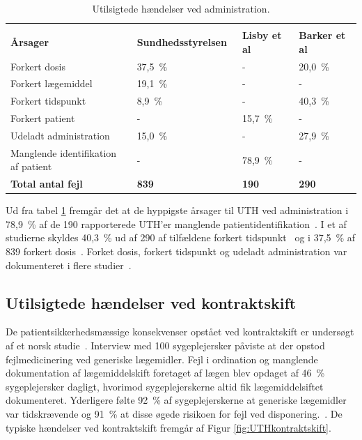 \vspace{2mm}
\begin{longtable}{p{5cm}|p{4.2cm}|p{2cm}|p{2cm}}
	\caption{Utilsigtede hændelser ved administration.}
	\vspace{2mm}
	\label{table:UTHAdministration} \\
\cellcolor[HTML]{C0C0C0} {\textbf{Årsager}} & 
{\cellcolor[HTML]{C0C0C0}\textbf{Sundhedsstyrelsen~\citep{Sundhedsstyrelsen2005}}} &
{\cellcolor[HTML]{C0C0C0}\textbf{Lisby et al~\citep{Lisby2005}}} &
{\cellcolor[HTML]{C0C0C0}\textbf{Barker et al~\citep{Barker2002}}} \\ \hline
Forkert dosis & 37,5~\% & - & 20,0~\% \\ \hline
Forkert lægemiddel & 19,1~\% & - & - \\ \hline
Forkert tidspunkt & 8,9~\% & - & 40,3~\% \\ \hline
Forkert patient & - & 15,7~\% &  - \\ \hline
Udeladt administration & 15,0~\% & - & 27,9~\% \\ \hline
Manglende identifikation af patient & - & 78,9~\% & - \\ \hline
\cellcolor[HTML]{C0C0C0} {\textbf{Total antal fejl}} & 
{\cellcolor[HTML]{C0C0C0}\textbf{839}} &
{\cellcolor[HTML]{C0C0C0}\textbf{190}} &
{\cellcolor[HTML]{C0C0C0}\textbf{290}}
\end{longtable}
\vspace{0.25cm}

Ud fra tabel \ref{table:UTHAdministration} fremgår det at de hyppigste årsager til UTH ved administration i 78,9~\% af de 190 rapporterede UTH'er manglende patientidentifikation~\citep{Lisby2005}. I et af studierne skyldes 40,3~\% ud af 290 af tilfældene forkert tidspunkt~\citep{Barker2002} og i 37,5~\% af 839 forkert dosis~\citep{Sundhedsstyrelsen2005}. Forket dosis, forkert tidspunkt og udeladt administration var dokumenteret i flere studier~\citep{Lisby2005,Sundhedsstyrelsen2005,Barker2002}.

\subsection{Utilsigtede hændelser ved kontraktskift}
De patientsikkerhedsmæssige konsekvenser opstået ved kontraktskift er undersøgt af et norsk studie~\citep{Hakonsen2010}. Interview med 100 sygeplejersker påviste at der opstod fejlmedicinering ved generiske lægemidler. Fejl i ordination og manglende dokumentation af lægemiddelskift foretaget af lægen blev opdaget af 46~\% sygeplejersker dagligt, hvorimod sygeplejerskerne altid fik lægemiddelsiftet dokumenteret. Yderligere følte 92~\% af sygeplejerskerne at generiske lægemidler var tidskrævende og 91~\% at disse øgede risikoen for fejl ved disponering.~\citep{Hakonsen2010}. De typiske hændelser ved kontraktskift fremgår af Figur \ref{fig:UTHkontraktskift}.


